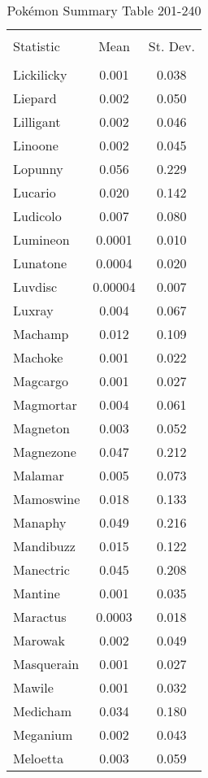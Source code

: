\documentclass[12pt,twoside]{reedthesis}
\begin{document}
  \begin{table}[!htbp] \centering 
    \caption{Pokémon Summary Table 201-240} 
    \label{} 
  \begin{tabular}{@{\extracolsep{5pt}}lcc} 
  \\[-1.8ex]\hline 
  \hline \\[-1.8ex] 
  Statistic & \multicolumn{1}{c}{Mean} & \multicolumn{1}{c}{St. Dev.} \\ 
  \hline \\[-1.8ex] 
  Lickilicky & 0.001 & 0.038 \\ 
  Liepard & 0.002 & 0.050 \\ 
  Lilligant & 0.002 & 0.046 \\ 
  Linoone & 0.002 & 0.045 \\ 
  Lopunny & 0.056 & 0.229 \\ 
  Lucario & 0.020 & 0.142 \\ 
  Ludicolo & 0.007 & 0.080 \\ 
  Lumineon & 0.0001 & 0.010 \\ 
  Lunatone & 0.0004 & 0.020 \\ 
  Luvdisc & 0.00004 & 0.007 \\ 
  Luxray & 0.004 & 0.067 \\ 
  Machamp & 0.012 & 0.109 \\ 
  Machoke & 0.001 & 0.022 \\ 
  Magcargo & 0.001 & 0.027 \\ 
  Magmortar & 0.004 & 0.061 \\ 
  Magneton & 0.003 & 0.052 \\ 
  Magnezone & 0.047 & 0.212 \\ 
  Malamar & 0.005 & 0.073 \\ 
  Mamoswine & 0.018 & 0.133 \\ 
  Manaphy & 0.049 & 0.216 \\ 
  Mandibuzz & 0.015 & 0.122 \\ 
  Manectric & 0.045 & 0.208 \\ 
  Mantine & 0.001 & 0.035 \\ 
  Maractus & 0.0003 & 0.018 \\ 
  Marowak & 0.002 & 0.049 \\ 
  Masquerain & 0.001 & 0.027 \\ 
  Mawile & 0.001 & 0.032 \\ 
  Medicham & 0.034 & 0.180 \\ 
  Meganium & 0.002 & 0.043 \\ 
  Meloetta & 0.003 & 0.059 \\ 

\end{tabular}
\end{table}
\end{document}
